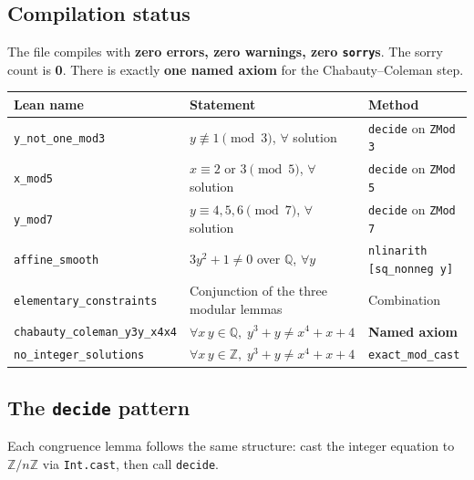 \documentclass[12pt, a4paper]{article}
\theoremstyle{definition}
\newcommand{\Z}{\mathbb{Z}}
\newcommand{\Q}{\mathbb{Q}}
\begin{document}
\subsection{Compilation status}

The file compiles with \textbf{zero errors, zero warnings, zero \texttt{sorry}s}.
The sorry count is \textbf{0}.  There is exactly \textbf{one named axiom} for the
Chabauty--Coleman step.

\begin{center}
\renewcommand{\arraystretch}{1.3}
\begin{tabular}{lll}
\toprule
\textbf{Lean name} & \textbf{Statement} & \textbf{Method} \\
\midrule
\texttt{y\_not\_one\_mod3}           & $y \not\equiv 1 \pmod 3$, $\forall$ solution                           & \texttt{decide} on \texttt{ZMod 3} \\
\texttt{x\_mod5}                     & $x \equiv 2$ or $3 \pmod 5$, $\forall$ solution                        & \texttt{decide} on \texttt{ZMod 5} \\
\texttt{y\_mod7}                     & $y \equiv 4,5,6 \pmod 7$, $\forall$ solution                           & \texttt{decide} on \texttt{ZMod 7} \\
\texttt{affine\_smooth}              & $3y^2+1 \neq 0$ over $\Q$, $\forall y$                                 & \texttt{nlinarith [sq\_nonneg y]} \\
\texttt{elementary\_constraints}     & Conjunction of the three modular lemmas                                & Combination \\
\midrule
\texttt{chabauty\_coleman\_y3y\_x4x4} & $\forall x\,y \in \Q,\; y^3+y \neq x^4+x+4$                         & \textbf{Named axiom} \\
\midrule
\texttt{no\_integer\_solutions}      & $\forall x\,y \in \Z,\; y^3+y \neq x^4+x+4$                          & \texttt{exact\_mod\_cast} \\
\bottomrule
\end{tabular}
\end{center}

\subsection{The \texttt{decide} pattern}

Each congruence lemma follows the same structure: cast the integer equation to
$\Z/n\Z$ via \texttt{Int.cast}, then call \texttt{decide}.
\end{document}
